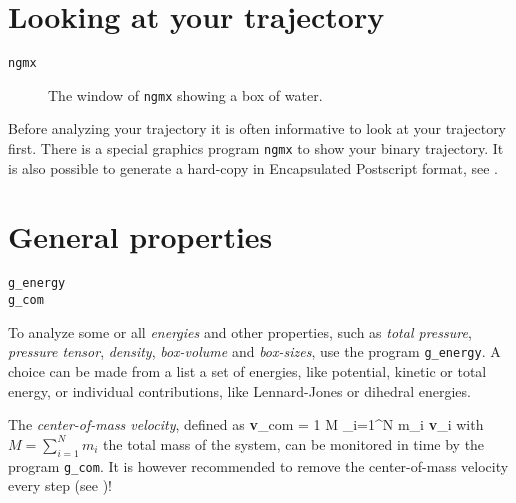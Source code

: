 
\section{Looking at your trajectory}
\label{sec:lookwhostalking}
\begin{verbatim}
ngmx
\end{verbatim}

\begin{figure}
\centerline{
{}}
\caption{The window of {\tt ngmx} showing a box of water.}
\label{fig:ngmxdump}
\end{figure}

Before analyzing your trajectory it is often informative to look at
your trajectory first. There is a special graphics program {\tt ngmx}
to show your binary trajectory. It is also possible to generate a
hard-copy in Encapsulated Postscript format, see
.


\section{General properties}
\label{sec:genprop}
\begin{verbatim}
g_energy
g_com
\end{verbatim}
To analyze some or all {\em energies} and other properties, such as
{\em total pressure}, {\em pressure tensor}, {\em density}, {\em
box-volume} and {\em box-sizes}, use the program {\tt g\_energy}.  A
choice can be made from a list a set of energies, like potential,
kinetic or total energy, or individual contributions, like
Lennard-Jones or dihedral energies.

The {\em center-of-mass velocity}, defined as
\beq
{\bf v}_{com} = {1 \over M} \sum_{i=1}^N m_i {\bf v}_i
\eeq
with $M = \sum_{i=1}^N m_i$ the total mass of the system, can be
monitored in time by the program {\tt g\_com}. It is however
recommended to remove the center-of-mass velocity every step (see
)!


